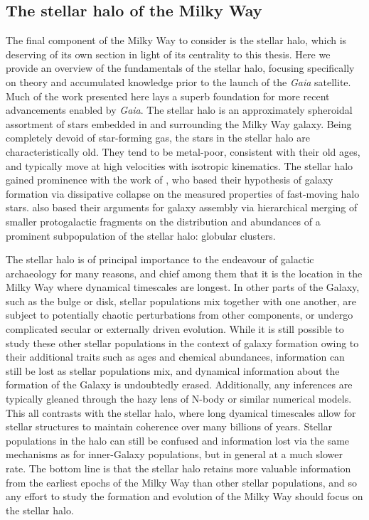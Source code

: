 \subsection{The stellar halo of the Milky Way}

The final component of the Milky Way to consider is the stellar halo, which is deserving of its own section in light of its centrality to this thesis. Here we provide an overview of the fundamentals of the stellar halo, focusing specifically on theory and accumulated knowledge prior to the launch of the \textit{Gaia} satellite. Much of the work presented here lays a superb foundation for more recent advancements enabled by \textit{Gaia}. The stellar halo is an approximately spheroidal assortment of stars embedded in and surrounding the Milky Way galaxy. Being completely devoid of star-forming gas, the stars in the stellar halo are characteristically old. They tend to be metal-poor, consistent with their old ages, and typically move at high velocities with isotropic kinematics. The stellar halo gained prominence with the work of \textcite{eggen62}, who based their hypothesis of galaxy formation via dissipative collapse on the measured properties of fast-moving halo stars. \textcite{searle78} also based their arguments for galaxy assembly via hierarchical merging of smaller protogalactic fragments on the distribution and abundances of a prominent subpopulation of the stellar halo: globular clusters. 

The stellar halo is of principal importance to the endeavour of galactic archaeology for many reasons, and chief among them that it is the location in the Milky Way where dynamical timescales are longest. In other parts of the Galaxy, such as the bulge or disk, stellar populations mix together with one another, are subject to potentially chaotic perturbations from other components, or undergo complicated secular or externally driven evolution. While it is still possible to study these other stellar populations in the context of galaxy formation owing to their additional traits such as ages and chemical abundances, information can still be lost as stellar populations mix, and dynamical information about the formation of the Galaxy is undoubtedly erased. Additionally, any inferences are typically gleaned through the hazy lens of N-body or similar numerical models. This all contrasts with the stellar halo, where long dyamical timescales allow for stellar structures to maintain coherence over many billions of years. Stellar populations in the halo can still be confused and information lost via the same mechanisms as for inner-Galaxy populations, but in general at a much slower rate. The bottom line is that the stellar halo retains more valuable information from the earliest epochs of the Milky Way than other stellar populations, and so any effort to study the formation and evolution of the Milky Way should focus on the stellar halo.

